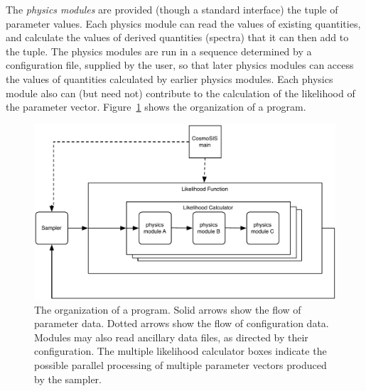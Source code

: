 \documentclass[draftmode,draftwater]{memarticle}
\newcommand{\cosmosis}{\name{CosmoSIS}\xspace}
\begin{document}
The \emph{physics modules} are provided (though a standard interface)
the tuple of parameter values. Each physics module can read the values
of existing quantities, and calculate the values of derived quantities
(\eg spectra) that it can then add to the tuple. The physics modules are
run in a sequence determined by a configuration file, supplied by the
user, so that later physics modules can access the values of quantities
calculated by earlier physics modules. Each physics module also can (but
need not) contribute to the calculation of the likelihood of the
parameter vector. Figure~\ref{fig:despes} shows the organization of a
\cosmosis program.

\begin{figure}[htb]
  \includegraphics[width=\textwidth]{despes}
  \caption{The organization of a \cosmosis program. Solid arrows show
    the flow of parameter data. Dotted arrows show the flow of
    configuration data. Modules may also read ancillary data files, as
    directed by their configuration. The multiple likelihood calculator
    boxes indicate the possible parallel processing of multiple
    parameter vectors produced by the sampler.}
  \label{fig:despes}
\end{figure}

\end{document}
